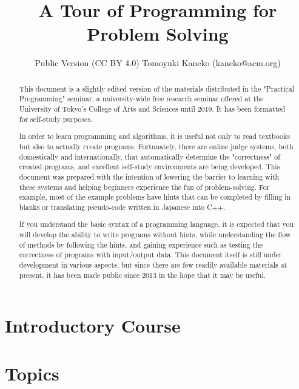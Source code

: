 \documentclass[report]{book}
\title{A Tour of Programming for Problem Solving}
\author{Public Version (CC BY 4.0) Tomoyuki Kaneko (kaneko@acm.org)}
\date{}
\begin{document}
\maketitle

\begin{versionoutside}
 
\begin{abstract}
This document is a slightly edited version of the materials distributed in the "Practical Programming" seminar, a university-wide free research seminar offered at the University of Tokyo's College of Arts and Sciences until 2019. It has been formatted for self-study purposes.

In order to learn programming and algorithms, it is useful not only to read textbooks but also to actually create programs. Fortunately, there are online judge systems, both domestically and internationally, that automatically determine the "correctness" of created programs, and excellent self-study environments are being developed. This document was prepared with the intention of lowering the barrier to learning with these systems and helping beginners experience the fun of problem-solving. For example, most of the example problems have hints that can be completed by filling in blanks or translating pseudo-code written in Japanese into C++.

If you understand the basic syntax of a programming language, it is expected that you will develop the ability to write programs without hints, while understanding the flow of methods by following the hints, and gaining experience such as testing the correctness of programs with input/output data. This document itself is still under development in various aspects, but since there are few readily available materials at present, it has been made public since 2013 in the hope that it may be useful.
\end{abstract}
\end{versionoutside}


\tableofcontents


\part{Introductory Course}



\part{Topics}
\end{document}
